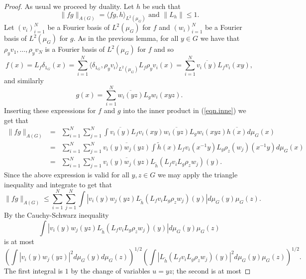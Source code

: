 \documentclass[12pt]{amsart}
\numberwithin{equation}{section}
\theoremstyle{plain}
\theoremstyle{definition}
\renewcommand{\leq}{\leqslant}
\begin{document}
\begin{proof}
As usual we proceed by duality.  Let $h$ be such that
\begin{equation}\label{eqn.inne}
\|fg\|_{A(G)}=\langle fg,h\rangle_{L^2(\mu_G)} \textrm{ and } \|L_h\| \leq 1.
\end{equation}
Let $(v_i)_{i=1}^N$ be a Fourier basis of $L^2(\mu_G)$ for $f$ and $(w_i)_{i=1}^N$ be a Fourier basis of $L^2(\mu_G)$ for $g$. As in the previous lemma, for all $y \in G$ we have that $\rho_yv_1,\dots,\rho_yv_N$ is a Fourier basis of $L^2(\mu_G)$ for $f$ and so
\begin{equation*}
f(x)= L_f\delta_{1_G}(x)=\sum_{i=1}^N{\langle \delta_{1_G},\rho_yv_i\rangle_{L^2(\mu_G)}L_f\rho_yv_i(x)}=\sum_{i=1}^N{\overline{v_i(y)}L_fv_i(xy)},
\end{equation*}
and similarly
\begin{equation*}
g(x) = \sum_{i=1}^N{\overline{w_i(yz)}L_gw_i(xyz)}.
\end{equation*}
Inserting these expressions for $f$ and $g$ into the inner product in (\ref{eqn.inne}) we get that
\begin{eqnarray*}
\|fg\|_{A(G)} & = & \sum_{i=1}^N{\sum_{j=1}^N{\int{\overline{v_i(y)}L_fv_i(xy)\overline{w_i(yz)}L_gw_i(xyz)\overline{h(x)}d\mu_G(x)}}}\\ & = & \sum_{i=1}^N{\sum_{j=1}^N{\overline{v_i(y)w_j(yz)}\int{\tilde{h}(x)L_fv_i(x^{-1}y)L_g\rho_{z}(w_j)(x^{-1}y)d\mu_G(x)}}}\\& = & \sum_{i=1}^N{\sum_{j=1}^N{\overline{v_i(y)w_j(yz)}L_{\tilde{h}}(L_fv_iL_g\rho_{z}w_j)(y)}}.
\end{eqnarray*}
Since the above expression is valid for all $y,z \in G$ we may apply the triangle inequality and integrate to get that
\begin{equation*}
\|fg\|_{A(G)} \leq \sum_{i=1}^N{\sum_{j=1}^N{\int{|v_i(y)w_j(yz)L_{\tilde{h}}(L_fv_iL_g\rho_{z}w_j)(y)|d\mu_G(y)\mu_G(z)}}}.
\end{equation*}
By the Cauchy-Schwarz inequality 
\begin{equation*}
\int{|v_i(y)w_j(yz)L_{\tilde{h}}(L_fv_iL_g\rho_{z}w_j)(y)|d\mu_G(y)\mu_G(z)}
\end{equation*}
is at most
\begin{equation*}
\left(\int{|v_i(y)w_j(yz)|^2d\mu_G(y)d\mu_G(z)}\right)^{1/2}\left(\int{|L_{\tilde{h}}(L_fv_iL_g\rho_{z}w_j)(y)|^2d\mu_G(y)\mu_G(z)}\right)^{1/2}.
\end{equation*}
The first integral is $1$ by the change of variables $u=yz$; the second is at most

\end{proof}
\end{document}
